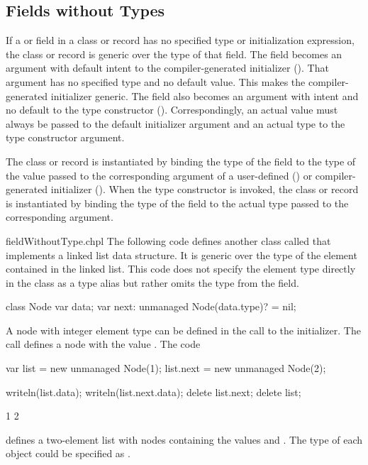 \subsection{Fields without Types}
\label{Fields_without_Types}

If a  or  field in a class or record has no specified type or
initialization expression, the class or record is generic over the
type of that field.  The field becomes an argument with default intent to
the compiler-generated initializer ().
That argument has no specified type and no default
value. This makes the compiler-generated initializer generic.
The field also becomes an argument with  intent and no default
to the type constructor ().
Correspondingly, an actual value must always be passed to the default
initializer argument and an actual type to the type constructor argument.

The class or record is instantiated by binding the type of the field
to the type of the value passed to the corresponding argument
of a user-defined () or compiler-generated initializer ().
When the type constructor is invoked, the class or record is instantiated
by binding the type of the field to the actual type passed to
the corresponding argument.

\begin{chapelexample}{fieldWithoutType.chpl}
The following code defines another class called  that
implements a linked list data structure.  It is generic over the type
of the element contained in the linked list.  This code does not
specify the element type directly in the class as a type alias but
rather omits the type from the  field.
\begin{chapel}
class Node {
  var data;
  var next: unmanaged Node(data.type)? = nil;
}
\end{chapel}
A node with integer element type can be defined in the call to the
initializer.  The call  defines a node with the
value .  The code
\begin{chapel}
var list = new unmanaged Node(1);
list.next = new unmanaged Node(2);
\end{chapel}
\begin{chapelpost}
writeln(list.data);
writeln(list.next.data);
delete list.next;
delete list;
\end{chapelpost}
\begin{chapeloutput}
1
2
\end{chapeloutput}
defines a two-element list with nodes containing the values 
and .  The type of each object could be specified
as .
\end{chapelexample}

